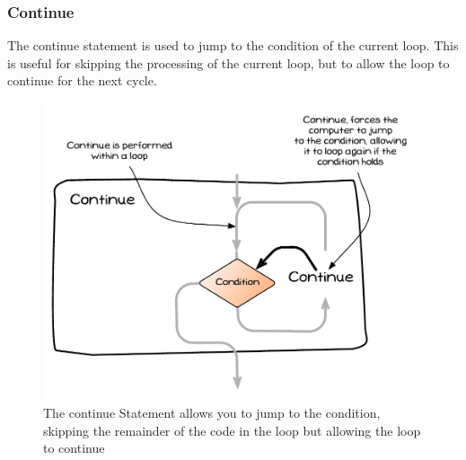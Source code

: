 \clearpage
\subsubsection{Continue} %
\label{sub:continue}

The continue statement is used to jump to the condition of the current loop. This is useful for skipping the processing of the current loop, but to allow the loop to continue for the next cycle.

\begin{figure}[h]
   \centering
   \includegraphics[width=\textwidth]{./topics/control-flow/diagrams/Continue} 
   \caption{The continue Statement allows you to jump to the condition, skipping the remainder of the code in the loop but allowing the loop to continue}
   \label{fig:continue}
\end{figure}




